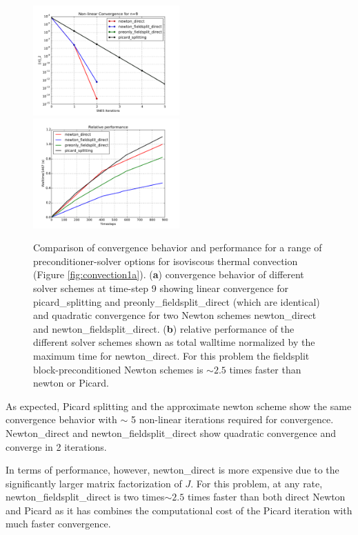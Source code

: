 \begin{figure}[htb]
  \centering
\includegraphics[width=0.5\textwidth]{figures/Solver_comparison_SNES_convergence_isoviscous.pdf}\hfill{}
\includegraphics[width=0.5\textwidth]{figures/Solver_comparison_Walltime_isoviscous.pdf}\\
\caption{Comparison of convergence behavior and performance for a
  range of preconditioner-solver options for isoviscous thermal
  convection (Figure \ref{fig:convection1a}).  (\textbf{a})
  convergence behavior of different solver schemes at time-step 9
  showing linear convergence for picard\_splitting and
  preonly\_fieldsplit\_direct (which are identical) and quadratic convergence for
  two Newton schemes   newton\_direct and newton\_fieldsplit\_direct. (\textbf{b}) relative
  performance of the different solver schemes shown as total walltime
  normalized by the maximum time for newton\_direct.  For this problem
the fieldsplit block-preconditioned Newton schemes is $\sim2.5$ times
faster than newton or Picard.}
  \label{fig:isoviscous_conv_perf}
\end{figure}

As expected, Picard splitting and the approximate newton scheme show
the same convergence behavior with $\sim$ 5 non-linear iterations
required for convergence.  Newton\_direct and
newton\_fieldsplit\_direct show quadratic convergence and converge in
2 iterations. 

In terms of performance, however, newton\_direct is more expensive due
to the significantly larger matrix factorization of $J$.  For this
problem, at any rate,  newton\_fieldsplit\_direct is two
times$\sim2.5$ times  faster than both direct Newton and Picard as it has combines the
computational cost of the Picard iteration with much faster
convergence. 


